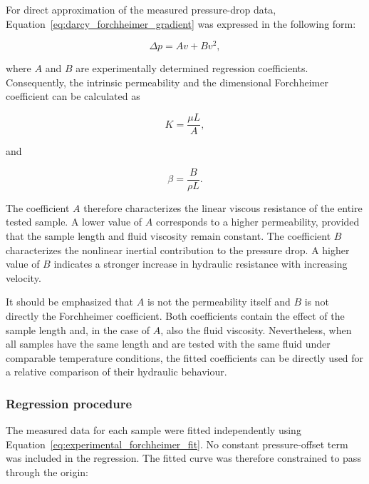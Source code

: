 \documentclass[a4paper]{article}
\begin{document}
For direct approximation of the measured pressure-drop data, Equation~\eqref{eq:darcy_forchheimer_gradient} was expressed in the following form:

\begin{equation}
    \Delta p = A v + B v^2,
    \label{eq:experimental_forchheimer_fit}
\end{equation}

where \(A\) and \(B\) are experimentally determined regression coefficients. Consequently, the intrinsic permeability and the dimensional Forchheimer coefficient can be calculated as

\begin{equation}
    K = \frac{\mu L}{A},
    \label{eq:permeability_from_A}
\end{equation}

and

\begin{equation}
    \beta = \frac{B}{\rho L}.
    \label{eq:forchheimer_from_B}
\end{equation}

The coefficient \(A\) therefore characterizes the linear viscous resistance of the entire tested sample. A lower value of \(A\) corresponds to a higher permeability, provided that the sample length and fluid viscosity remain constant. The coefficient \(B\) characterizes the nonlinear inertial contribution to the pressure drop. A higher value of \(B\) indicates a stronger increase in hydraulic resistance with increasing velocity.

It should be emphasized that \(A\) is not the permeability itself and \(B\) is not directly the Forchheimer coefficient. Both coefficients contain the effect of the sample length and, in the case of \(A\), also the fluid viscosity. Nevertheless, when all samples have the same length and are tested with the same fluid under comparable temperature conditions, the fitted coefficients can be directly used for a relative comparison of their hydraulic behaviour.

\subsubsection{Regression procedure}
\label{subsec:regression_procedure}

The measured data for each sample were fitted independently using Equation~\eqref{eq:experimental_forchheimer_fit}. No constant pressure-offset term was included in the regression. The fitted curve was therefore constrained to pass through the origin:
\end{document}

